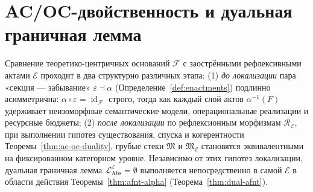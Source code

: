 \documentclass[11pt]{article}
\theoremstyle{plain}
\theoremstyle{definition}
\newcommand{\cF}{\mathcal{F}}
\newcommand{\fM}{\mathfrak{M}}
\newcommand{\LAbs}{\mathcal{L}_{\mathrm{Abs}}}
\newcommand{\cE}{\mathcal{E}}
\newcommand{\LAbsE}{\LAbs^{\cE}}
\DeclareMathOperator{\id}{id}
\begin{document}
\section{AC/OC-двойственность и дуальная граничная лемма}\label{sec:ac-oc-duality}

Сравнение теоретико-центричных оснований $\cF$ с заострёнными рефлексивными актами $\cE$ проходит в два структурно различных этапа: (1) \emph{до локализации} пара «секция --- забывание» $\varepsilon \dashv \alpha$ (Определение~\ref{def:enactments}) подлинно асимметрична: $\alpha \circ \varepsilon = \id_\cF$ строго, тогда как каждый слой актов $\alpha^{-1}(F)$ удерживает неизоморфные семантические модели, операциональные реализации и ресурсные бюджеты; (2) \emph{после локализации} по рефлексионным морфизмам $\mathcal{R}_\cE$, при выполнении гипотез существования, спуска и когерентности Теоремы~\ref{thm:ac-oc-duality}, грубые стеки $\fM$ и $\fM_\cE$ становятся эквивалентными на фиксированном категорном уровне. Независимо от этих гипотез локализации, дуальная граничная лемма $\LAbsE = \emptyset$ выполняется непосредственно в самой $\cE$ в области действия Теоремы~\ref{thm:afnt-alpha} (Теорема~\ref{thm:dual-afnt}).
\end{document}
